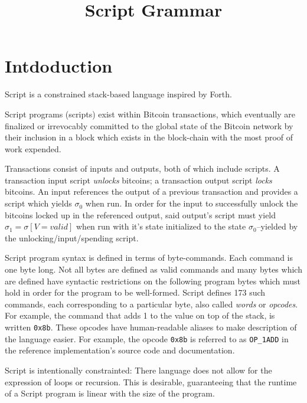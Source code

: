\documentclass{article}
\begin{document}

\title{Script Grammar}
\date{}
\maketitle


\section{Intdoduction}

Script is a constrained stack-based language inspired by Forth.

Script programs (scripts) exist within Bitcoin transactions, which eventually are finalized or irrevocably committed to the global state of the Bitcoin network by their inclusion in a block which exists in the block-chain with the most proof of work expended.

Transactions consist of inputs and outputs, both of which include scripts. A transaction input script \textit{unlocks} bitcoins; a transaction output script \textit{locks} bitcoins. An input references the output of a previous transaction and provides a script which yields $\sigma_0$ when run. In order for the input to successfully unlock the bitcoins locked up in the referenced output, said output's script must yield $\sigma_1 = \sigma[V = valid]$ when run with it's state initialized to the state $\sigma_0$--yielded by the unlocking/input/spending script.


Script program syntax is defined in terms of byte-commands. Each command is one byte long. Not all bytes are defined as valid commands and many bytes which are defined have syntactic restrictions on the following program bytes which must hold in order for the program to be well-formed. Script defines 173 such commands, each corresponding to a particular byte, also called \textit{words} or \textit{opcodes}. For example, the command that adds 1 to the value on top of the stack, is written \texttt{0x8b}. These opcodes have human-readable aliases to make description of the language easier. For example, the opcode \texttt{0x8b} is referred to as \texttt{OP\_1ADD} in the reference implementation's source code and documentation.

Script is intentionally constrainted: There language does not allow for the expression of loops or recursion. This is desirable, guaranteeing that the runtime of a Script program is linear with the size of the program.
\end{document}
